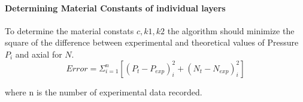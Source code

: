 \documentclass[review]{elsarticle}
\begin{document}
\paragraph{Determining Material Constants of individual layers} To determine the material constats $c,k1,k2$  the algorithm should minimize the square of the difference between experimental and theoretical values of 
Pressure $P_i$ and axial for $N$.
\begin{equation}
    Error = \Sigma_{i=1}^{n}[(P_t -P_{exp})_i^2+(N_t-N_{exp})_i^2 ]
\end{equation}

where n is the number of experimental data recorded.

\end{document}
